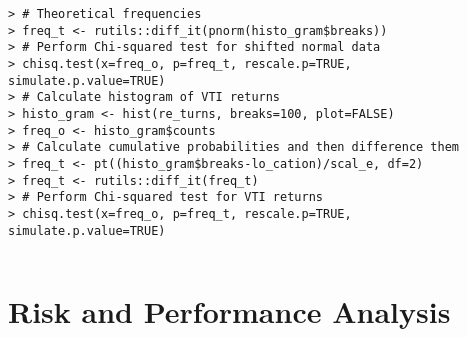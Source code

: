 \documentclass[10pt]{beamer}\usepackage[]{graphicx}\usepackage[]{color}
\makeatletter
\newenvironment{kframe}{%
 \def\at@end@of@kframe{}%
 \ifinner\ifhmode%
  \def\at@end@of@kframe{\end{minipage}}%
  \begin{minipage}{\columnwidth}%
 \fi\fi%
 \def\FrameCommand##1{\hskip\@totalleftmargin \hskip-\fboxsep
 \colorbox{shadecolor}{##1}\hskip-\fboxsep
     \hskip-\linewidth \hskip-\@totalleftmargin \hskip\columnwidth}%
 \MakeFramed {\advance\hsize-\width
   \@totalleftmargin\z@ \linewidth\hsize
   \@setminipage}}%
 {\par\unskip\endMakeFramed%
 \at@end@of@kframe}
\newenvironment{knitrout}{}{} %
\makeatother
\begin{document}
\begin{frame}[fragile,t]{\subsecname}
\begin{block}{}
\begin{columns}[T]
\begin{knitrout}
\begin{kframe}
\begin{verbatim}
> # Theoretical frequencies
> freq_t <- rutils::diff_it(pnorm(histo_gram$breaks))
> # Perform Chi-squared test for shifted normal data
> chisq.test(x=freq_o, p=freq_t, rescale.p=TRUE, simulate.p.value=TRUE)
> # Calculate histogram of VTI returns
> histo_gram <- hist(re_turns, breaks=100, plot=FALSE)
> freq_o <- histo_gram$counts
> # Calculate cumulative probabilities and then difference them
> freq_t <- pt((histo_gram$breaks-lo_cation)/scal_e, df=2)
> freq_t <- rutils::diff_it(freq_t)
> # Perform Chi-squared test for VTI returns
> chisq.test(x=freq_o, p=freq_t, rescale.p=TRUE, simulate.p.value=TRUE)
\end{verbatim}
\end{kframe}
\end{knitrout}
  \end{columns}
\end{block}

\end{frame}



\section{Risk and Performance Analysis}


\end{document}
